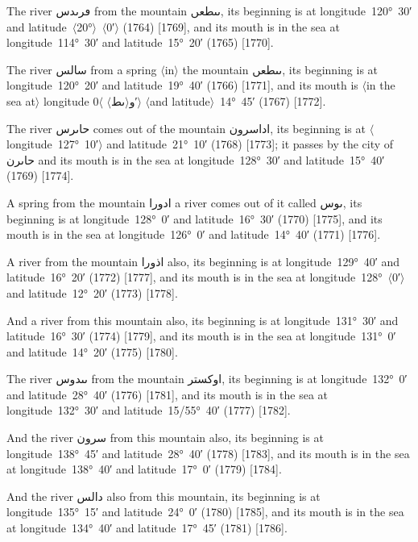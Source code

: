 \documentclass[11pt]{article}
\newcommand{\Pg}[1]{\marginpar{\footnotesize #1}}
\newcommand{\Ang}[1]{\ensuremath{#1}}
\newcommand{\AngOpen}{\ensuremath{\rangle}}
\newcommand{\AngClose}{\ensuremath{\langle}}
\begin{document}
The river \textarabic{ڡرٮدس} from the mountain \textarabic{ٮٮطعں}, its beginning is at longitude~120°~30′ and latitude~\Ang{\langle}20°\Ang{\rangle}~\Ang{\langle}0′\Ang{\rangle} (1764) [1769], and its mouth is in the sea at longitude~114°~30′ and latitude~15°~20′ (1765) [1770].

The river \textarabic{سالس} from a spring \Ang{\langle}in\Ang{\rangle} the mountain \textarabic{ٮٮطعں}, its beginning is at longitude~120°~20′ and latitude~19°~40′ (1766) [1771], and its mouth is \Ang{\langle}in the sea at\Ang{\rangle} longitude \textarabic{و\AngOpen{}ٮط\AngClose{}} \Ang{\langle}0′\Ang{\rangle} \Ang{\langle}and latitude\Ang{\rangle}~14°~45′ (1767) [1772].

The river \textarabic{حاٮرس} comes out of the mountain \textarabic{اداسرون}, its beginning is at \Ang{\langle}longitude~127°~10′\Ang{\rangle} and latitude~21°~10′ (1768) [1773]; it passes by the city of \textarabic{حاٮرن} and its mouth is in the sea at longitude~128°~30′ and latitude~15°~40′ (1769) [1774].

A spring from the mountain \textarabic{ادورا} a river comes out of it called \textarabic{ٮوس}, its beginning is at longitude~128°~0′ and latitude~16°~30′ (1770) [1775], and its mouth is in the sea at longitude~126°~0′ and latitude~14°~40′ (1771) [1776].

A river from the mountain \textarabic{اذورا} also, its beginning is at longitude~129°~40′ and latitude~16°~20′ (1772) [1777], and its mouth is in the sea at longitude~128°~\Ang{\langle}0′\Ang{\rangle} and latitude~12°~20′ (1773) [1778].

And a river from this mountain also, its beginning is at longitude~131°~30′ and latitude~16°~30′ (1774) [1779], and its mouth is in the sea at longitude~131°~0′ and latitude~14°~20′ (1775) [1780]\Pg{p. 118}.

The river \textarabic{ٮٮدوس} from the mountain \textarabic{اوكستر}, its beginning is at longitude~132°~0′ and latitude~28°~40′ (1776) [1781], and its mouth is in the sea at longitude~132°~30′ and latitude~15/55°~40′ (1777) [1782].

And the river \textarabic{سرون} from this mountain also, its beginning is at longitude~138°~45′ and latitude~28°~40′ (1778) [1783], and its mouth is in the sea at longitude~138°~40′ and latitude~17°~0′ (1779) [1784].

And the river \textarabic{دالس} also from this mountain, its beginning is at longitude~135°~15′ and latitude~24°~0′ (1780) [1785], and its mouth is in the sea at longitude~134°~40′ and latitude~17°~45′ (1781) [1786].
\end{document}
